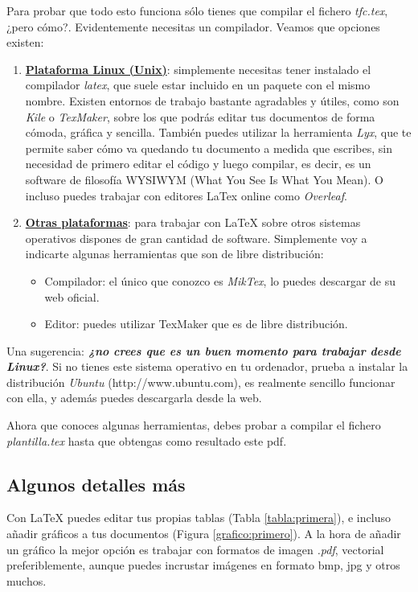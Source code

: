 Para probar que todo esto funciona sólo tienes que compilar el fichero \textit{tfc.tex}, ¿pero cómo?. Evidentemente necesitas un compilador. Veamos que opciones existen:

\begin{enumerate}
\item \textbf{\underline{Plataforma Linux (Unix)}}: simplemente necesitas tener instalado el compilador \textit{latex}, que suele estar incluido en un paquete con el mismo nombre. Existen entornos de trabajo bastante agradables y útiles, como son \textit{Kile} o \textit{TexMaker}, sobre los que podrás editar tus documentos de forma cómoda, gráfica y sencilla. También puedes utilizar la herramienta \textit{Lyx}, que te permite saber cómo va quedando tu documento a medida que escribes, sin necesidad de primero editar el código y luego compilar, es decir, es un software de filosofía WYSIWYM (What You See Is What You Mean). O incluso puedes trabajar con editores LaTex online como \textit{Overleaf}.
\item \textbf{\underline{Otras plataformas}}: para trabajar con \LaTeX{} sobre otros sistemas operativos dispones de gran cantidad de software. Simplemente voy a indicarte algunas herramientas que son de libre distribución:
\begin{itemize}
\item Compilador: el único que conozco es \textit{MikTex}, lo puedes descargar de su web oficial.
\item Editor: puedes utilizar TexMaker que es de libre distribución.
\end{itemize}
\end{enumerate}

Una sugerencia: \textbf{\textit{¿no crees que es un buen momento para trabajar desde Linux?}}. Si no tienes este sistema operativo en tu ordenador, prueba a instalar la distribución \textit{Ubuntu} (http://www.ubuntu.com), es realmente sencillo funcionar con ella, y además puedes descargarla desde la web.


Ahora que conoces algunas herramientas, debes probar a compilar el fichero \textit{plantilla.tex} hasta que obtengas como resultado este pdf.

\subsection{Algunos detalles más}

Con \LaTeX{} puedes editar tus propias tablas (Tabla \ref{tabla:primera}), e incluso añadir gráficos a tus documentos (Figura \ref{grafico:primero}). A la hora de añadir un gráfico la mejor opción es trabajar con formatos de imagen \textit{.pdf}, vectorial preferiblemente, aunque puedes incrustar imágenes en formato bmp, jpg y otros muchos.

